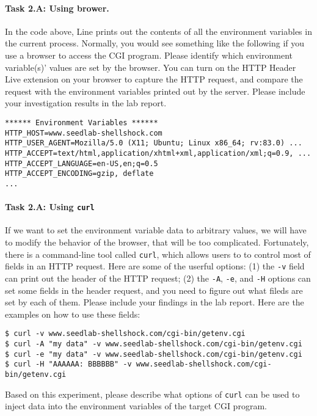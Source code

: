 \paragraph{Task 2.A: Using brower.}
In the code above, Line  prints out the contents of all the
environment variables in the current process. Normally, you would see something 
like the following if you use a browser to access the CGI program. Please 
identify which environment variable(s)' values are set by the browser.
You can turn on the HTTP Header Live extension on your browser to 
capture the HTTP request, and compare the request with the 
environment variables printed out by the server. Please include your 
investigation results in the lab report.

\begin{lstlisting}
****** Environment Variables ******
HTTP_HOST=www.seedlab-shellshock.com
HTTP_USER_AGENT=Mozilla/5.0 (X11; Ubuntu; Linux x86_64; rv:83.0) ...
HTTP_ACCEPT=text/html,application/xhtml+xml,application/xml;q=0.9, ...
HTTP_ACCEPT_LANGUAGE=en-US,en;q=0.5
HTTP_ACCEPT_ENCODING=gzip, deflate
...
\end{lstlisting}

 
\paragraph{Task 2.A: Using \texttt{curl}}
If we want to set the environment variable data to arbitrary values,
we will have to modify the behavior of the browser, that will be too complicated. 
Fortunately, there is a command-line tool called \texttt{curl}, which allows 
users to to control most of fields in an HTTP request. Here are some 
of the userful options: (1) the \texttt{-v} field can print out the header 
of the HTTP request; (2) the \texttt{-A}, \texttt{-e}, and 
\texttt{-H} options can set some fields in the header request, and
you need to figure out what fileds are set by each of them. 
Please include your findings in the lab report. 
Here are the examples on how to use these fields:
 

\begin{lstlisting}
$ curl -v www.seedlab-shellshock.com/cgi-bin/getenv.cgi
$ curl -A "my data" -v www.seedlab-shellshock.com/cgi-bin/getenv.cgi
$ curl -e "my data" -v www.seedlab-shellshock.com/cgi-bin/getenv.cgi
$ curl -H "AAAAAA: BBBBBB" -v www.seedlab-shellshock.com/cgi-bin/getenv.cgi
\end{lstlisting}
 
Based on this experiment, please describe what options of \texttt{curl} 
can be used to inject data into the environment variables of 
the target CGI program. 


